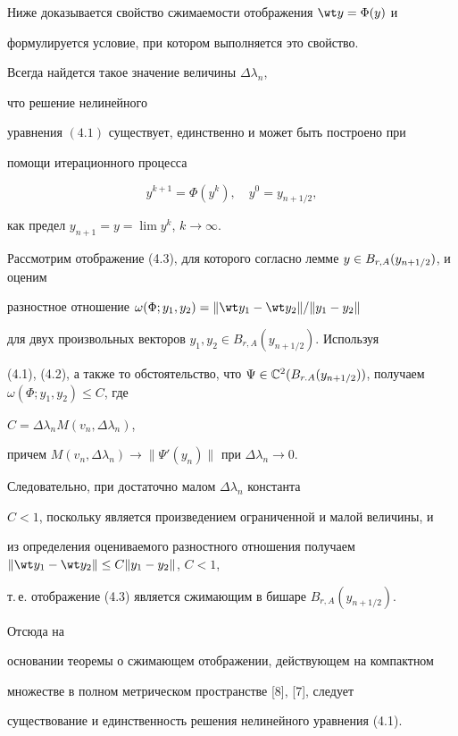  


Ниже доказывается свойство сжимаемости отображения $\wt y=\Phi(y)$ и 


формулируется условие, при котором выполняется это свойство. 


 


\begin{thmnonum} 


Всегда найдется такое значение величины $\Delta\lambda_n$, 


что решение нелинейного 


уравнения $(4.1)$ существует, единственно и может быть построено при 


помощи итерационного процесса 


\begin{equation} 


y^{k+1}=\Phi(y^k),\quad y^0=y_{n+1/2}, 


\end{equation} 


как предел $y_{n+1}=y=\lim y^k$, $k\to\infty$. 


\end{thmnonum} 


 


\begin{pf} 


Рассмотрим отображение (4.3), для которого согласно лемме $y\in \linebreak


B_{r,A}(y_{n+1/2})$, и оценим 


разностное отношение $\omega(\Phi;y_1,y_2)=\|\wt y_1-\wt y_2\|/\|y_1-y_2\|$ 


для двух произвольных векторов $y_1,y_2\in B_{r,A}(y_{n+1/2})$. Используя 


(4.1), (4.2), а также то обстоятельство, что $\Psi\in\Bbb 


C^2(B_{r.A}(y_{n+1/2}))$, получаем $\omega(\Phi;y_1,y_2)\le C$, где 


$C=\Delta\lambda_n M(v_n,\Delta\lambda_n)$, 


причем $M(v_n,\Delta\lambda_n)\to\|\Psi'(y_n)\|$ при $\Delta\lambda_n\to0$. 


Следовательно, при достаточно малом $\Delta\lambda_n$ константа 


$C<1$, поскольку является произведением ограниченной и малой величины, и 


из определения оцениваемого разностного отношения получаем $\|\wt y_1-\wt 


y_2\|\le C\|y_1-y_2\|$, $C<1$, 


т.\,е. отображение (4.3) является сжимающим в бишаре $B_{r,A}(y_{n+1/2})$. 


Отсюда на 


основании теоремы о сжимающем отображении, действующем на компактном 


множестве в полном метрическом пространстве [8], [7], следует 


существование и единственность решения нелинейного уравнения (4.1). 


\end{pf} 



